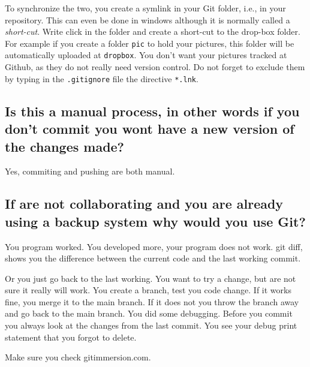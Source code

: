  To synchronize the two, you create a symlink in your Git folder, i.e., in your repository. This can even be done in windows although it is normally called a \textit{short-cut}. Write click in the folder and create a short-cut to the drop-box folder. For example if you create a folder \texttt{pic} to hold your pictures, this folder will be automatically uploaded at \texttt{dropbox}. You don't want your pictures tracked at Github, as they do not really need version control. Do not forget to exclude them by typing in the \texttt{.gitignore} file the directive  \verb|*.lnk|.

\subsection*{Is this a manual process, in other words if you don't commit you wont have a new version of the changes made?}

Yes, commiting and pushing are both manual.

\subsection*{If are not collaborating and you are already using a backup system why would you use Git?}

 You program worked. You developed more, your program does not work. git diff, shows you the difference between the current code and the last working commit.

 Or you just go back to the last working. You want to try a change, but are not sure it really will work. 
 You create a branch, test you code change. If it works fine, you merge it to the main branch. If it does not you throw the branch away and go back to the main branch.
 You did some debugging. Before you commit you always look at the changes from the last commit. You see your debug print statement that you forgot to delete.

Make sure you check gitimmersion.com.















